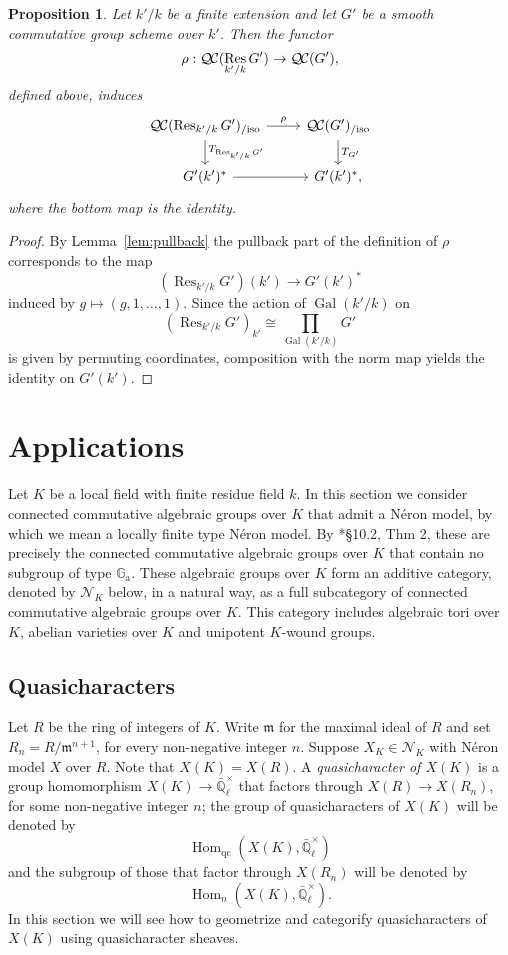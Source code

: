 \documentclass[CM,Submssn,SecEq]{degruyter-crelle} %
\theoremstyle{plain}
\newtheorem{proposition}[theorem]{Proposition}
\theoremstyle{definition}
\theoremstyle{remark}
\newcommand{\EE}{\mathbb{\bar Q}_\ell}
\newcommand{\Fq}{k}
\newcommand{\EEx}{\EE^\times}
\newcommand{\m}{{\mathfrak{m}}}
\DeclareMathOperator{\Gal}{Gal}
\DeclareMathOperator{\Hom}{Hom}
\DeclareMathOperator{\Res}{Res}
\newcommand{\TrFrob}[1]{T_{#1}}
\newcommand{\QC}{{\mathcal{Q\hskip-0.8pt C}}}
\newcommand{\QCiso}[1]{\QC(#1)_{/\text{iso}}}
\begin{document}
\begin{proposition}
Let $k'/k$ be a finite extension and let $G'$ be a smooth commutative group scheme over $k'$.
Then the functor 
\[
\rho : \QC(\Res_{k'/k}G') \to \QC(G'),
\]
defined above, induces
\[
\begin{tikzcd}
\QCiso{\Res_{k'/k} G'} \dar{\TrFrob{\Res_{k'/k} G'}} \rar{\rho} & \QCiso{G'} \dar{\TrFrob{G'}}\\
G'(k')^* \rar & G'(k')^*,
\end{tikzcd}
\]
where the bottom map is the identity.
\end{proposition}
\begin{proof}
By Lemma~\ref{lem:pullback} the pullback part of the definition of $\rho$ corresponds to the map
\[
(\Res_{k'/k}G')(k') \to G'(k')^*
\]
induced by $g \mapsto (g, 1, \ldots, 1)$.  Since the action of $\Gal(k'/k)$ on
\[
(\Res_{k'/k}G')_{k'} \cong \prod_{\Gal(k'/k)} G'
\]
is given by permuting coordinates, composition with the norm map yields the identity on $G'(k')$.
\end{proof}



\section{Applications}\label{sec:applications}%

Let $K$ be a local field with finite residue field $\Fq$. 
In this section we consider connected commutative algebraic groups over $K$ that admit a N\'eron model, by which we mean a locally finite type N\'eron model.
By \cite{bosch-lutkebohmert-reynaud:NeronModels}*{\S 10.2, Thm 2}, these are precisely the connected commutative algebraic groups over $K$ that contain no subgroup of type $\mathbb{G}_\text{a}$.
These algebraic groups over $K$ form an additive category, denoted by $\mathcal{N}_K$ below, in a natural way, as a full subcategory of connected commutative algebraic groups over $K$. This category includes algebraic tori over $K$, abelian varieties over $K$ and unipotent $K$-wound groups.

\subsection{Quasicharacters}

Let $R$ be the ring of integers of $K$.
Write $\m$ for the maximal ideal of $R$ and set $R_n = R/\m^{n+1}$, for every non-negative integer $n$.
Suppose $X_K \in \mathcal{N}_K$ with N\'eron model $X$ over $R$.
Note that $X(K) = X(R)$.
A {\it quasicharacter of $X(K)$} is a group homomorphism $X(K) \to \EEx$ that factors through $X(R) \to X(R_n)$, for some non-negative integer $n$;
the group of quasicharacters of $X(K)$ will be denoted by 
\[
\Hom_\text{qc}(X(K),\EEx)
\]
 and the subgroup of those that factor through $X(R_n)$ will be denoted by 
 \[
 \Hom_n(X(K),\EEx).
\]
In this section we will see how to geometrize and categorify quasicharacters of $X(K)$ using quasicharacter sheaves.
\end{document}
